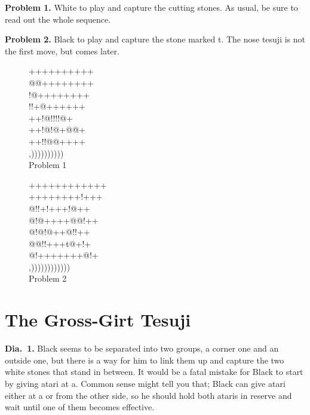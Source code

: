 \documentclass[mcrownvopaper,10pt,twopage,onecolumn,draft,showtrims]{memoir}
\begin{document}
\noindent
\textbf{Problem 1.} White to play and capture the cutting stones. As usual, be
sure to read out the whole sequence.

\noindent
\textbf{Problem 2.} Black to play and capture the stone marked {\gnos t}. The nose
tesuji is not the first move, but comes later.
\begin{figure}[ht]
    \begin{minipage}[c]{0.45\linewidth}
        \centering    
        {\gnos%
        ++++++++++\\
        @@++++++++\\
        !@++++++++\\
        !!+@++++++\\
        ++!@!!!!@+\\
        ++!@!@+@@+\\
        ++!!@@++++\\
        ,))))))))))\\
        }
        Problem 1
    \end{minipage}%
    \begin{minipage}[c]{0.55\linewidth}
        \centering    
        {\gnos%
        ++++++++++++\\
        ++++++++!+++\\
        @!!+!+++!@++\\
        @!@++++@@!++\\
        @!@!@++@!!++\\
        @@!!+++t@+!+\\
        @!+++++++@!+\\
        ,))))))))))))\\
        }
        Problem 2
    \end{minipage}%
\end{figure}
\section{The Gross-Girt Tesuji}

\noindent
\textbf{Dia.\ 1.} Black seems to be separated into two groups, a corner one and
an outside one, but there is a way for him to link them up and capture
the two white stones that stand in between.
It would be a fatal mistake for Black to start by giving atari at a.
Common sense might tell you that; Black can give atari either at a or
from the other side, so he should hold both ataris in reserve and wait
until one of them becomes effective.
\end{document}
